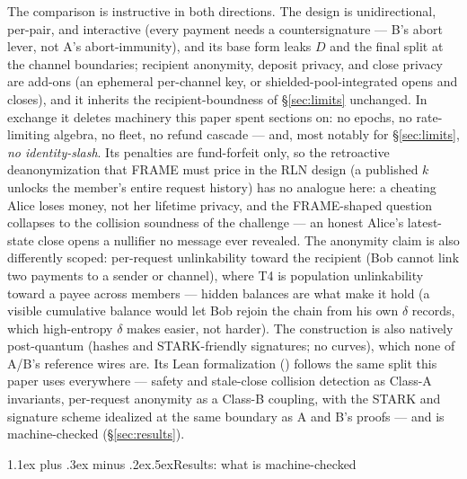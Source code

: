 \documentclass[9pt]{extarticle}
\makeatletter
\renewcommand\section{\@startsection{section}{1}{0pt}%
  {1.1ex plus .3ex minus .2ex}{.5ex}{\normalfont\Large\bfseries}}
\newcommand{\file}[1]{\path{#1}}
\makeatother
\begin{document}
The comparison is instructive in both directions. The design is
unidirectional, per-pair, and interactive (every payment needs a
countersignature --- B's abort lever, not A's abort-immunity), and its
base form leaks $D$ and the final split at the channel boundaries;
recipient anonymity, deposit privacy, and close privacy are add-ons (an
ephemeral per-channel key, or shielded-pool-integrated opens and closes),
and it inherits the recipient-boundness of \S\ref{sec:limits} unchanged.
In exchange it deletes machinery this paper spent sections on: no epochs,
no rate-limiting algebra, no fleet, no refund cascade --- and, most
notably for \S\ref{sec:limits}, \emph{no identity-slash}. Its penalties
are fund-forfeit only, so the retroactive deanonymization that FRAME must
price in the RLN design (a published $k$ unlocks the member's entire
request history) has no analogue here: a cheating Alice loses money, not
her lifetime privacy, and the FRAME-shaped question collapses to the
collision soundness of the challenge --- an honest Alice's latest-state
close opens a nullifier no message ever revealed. The anonymity claim is
also differently scoped: per-request unlinkability toward the recipient
(Bob cannot link two payments to a sender or channel), where T4 is
population unlinkability toward a payee across members --- hidden balances
are what make it hold (a visible cumulative balance would let Bob rejoin
the chain from his own $\delta$ records, which high-entropy $\delta$ makes
easier, not harder). The construction is also natively post-quantum
(hashes and STARK-friendly signatures; no curves), which none of A/B's
reference wires are. Its Lean formalization (\file{Zkpc/Chain/}) follows
the same split this paper uses everywhere --- safety and stale-close
collision detection as Class-A invariants, per-request anonymity as a
Class-B coupling, with the STARK and signature scheme idealized at the
same boundary as A and B's proofs --- and is machine-checked
(\S\ref{sec:results}).


\section{Results: what is machine-checked}\label{sec:results}
\end{document}
